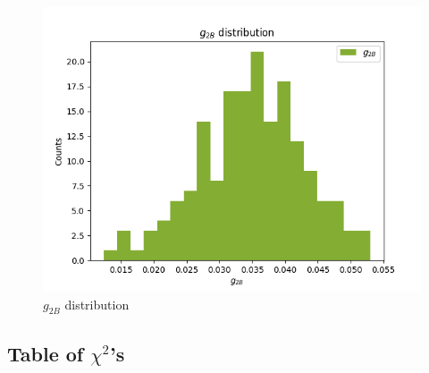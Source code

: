 \documentclass[
]{article}
\begin{document}
\begin{figure}
\centering
\includegraphics{pngplots/param8.png}
\caption{\(g_{2B}\) distribution}
\end{figure}

\hypertarget{table-of-chi2s}{%
\subsection{\texorpdfstring{Table of
\(\chi^2\)'s}{Table of \textbackslash chi\^{}2's}}\label{table-of-chi2s}}
\end{document}
